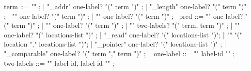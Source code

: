 \begin{syntax}
  term ::= "\null" ;
        | "\base_addr" { one-label? } "(" term ")" ;
        | "\block_length" { one-label? } "(" term ")" ;
        | "\offset" { one-label? } "(" term ")" ;
        | { "\allocation" one-label? "(" term ")" };
       \
  pred ::= { "\allocable" one-label? "(" term ")" };
       | "\freeable" { one-label? } "(" term ")" ;
       | { "\fresh" two-labels? "(" term, term ")" };
       | "\valid" { one-label? } "(" locations-list ")" ;
       | "\valid_read" { one-label? } "(" locations-list ")";
       | "\separated" "(" location "," locations-list ")";
       | { "\object_pointer" one-label? "(" locations-list ")" };
       | { "\pointer_comparable" one-label? "(" term "," term ")" };
       \
  { one-label } ::= { "{" label-id "}" } ;
       \
  { two-labels } ::= { "{" label-id, label-id "}" } ;
\end{syntax}

